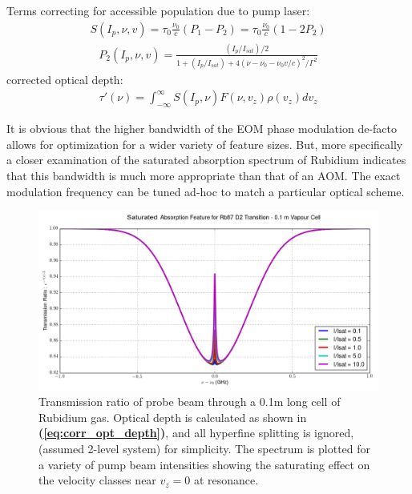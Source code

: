 Terms correcting for accessible population due to pump laser:
\begin{gather}
  S(I_p, \nu, v) = \tau_0 \frac{\nu_0}{c} (P_1 - P_2) =
    \tau_0 \frac{\nu_0}{c} (1 - 2 P_2)
\end{gather}
\begin{gather}
  P_2(I_p, \nu, v) = \frac{ (I_p/I_{sat})/2}{1 + (I_p/I_{sat}) +
    4(\nu - \nu_0 - \nu_0 v/c)^2/\Gamma^2}
\end{gather}
corrected optical depth:
\begin{gather}\label{eq:corr_opt_depth}
  \tau'(\nu) = \int_{-\infty}^\infty S(I_p, \nu) F(\nu, v_z) \rho(v_z) dv_z
\end{gather}

It is obvious that the higher bandwidth of the EOM phase modulation de-facto
allows for optimization for a wider variety of feature sizes. But, more
specifically a closer examination of the saturated absorption spectrum of
Rubidium indicates that this bandwidth is much more appropriate than that of an
AOM. The exact modulation frequency can be tuned ad-hoc to match a particular
optical scheme.

\begin{figure}[!hrt]
  \centering
  \includegraphics[scale=0.5]{rb_D2_single_absorption.png}
  \caption{Transmission ratio of probe beam through a 0.1m long cell of Rubidium
  gas. Optical depth is calculated as shown in
  \textbf{(\ref{eq:corr_opt_depth})},
  and all hyperfine splitting is ignored, (assumed 2-level system) for
  simplicity. The spectrum is plotted for a variety of pump beam intensities
  showing the saturating effect on the velocity classes near $v_z = 0$ at
  resonance.}
  \label{fig:rb87d2abs}
\end{figure}


